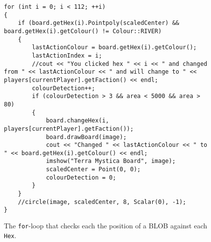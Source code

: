 \begin{figure}
\begin{lstlisting}
for (int i = 0; i < 112; ++i)
{
	if (board.getHex(i).Pointpoly(scaledCenter) && board.getHex(i).getColour() != Colour::RIVER)  
	{
		lastActionColour = board.getHex(i).getColour();
		lastActionIndex = i;
		//cout << "You clicked hex " << i << " and changed from " << lastActionColour << " and will change to " << players[currentPlayer].getFaction() << endl;
		colourDetection++;
		if (colourDetection > 3 && area < 5000 && area > 80) 
		{
			board.changeHex(i, players[currentPlayer].getFaction());
			board.drawBoard(image);
			cout << "Changed " << lastActionColour << " to " << board.getHex(i).getColour() << endl;
			imshow("Terra Mystica Board", image);
			scaledCenter = Point(0, 0);
			colourDetection = 0;
		}
	}
	//circle(image, scaledCenter, 8, Scalar(0), -1);
}
\end{lstlisting}
\caption{The \texttt{for}-loop that checks each the position of a BLOB against each \texttt{Hex}. \label{fig:changeHexForLoop}}
\end{figure}



